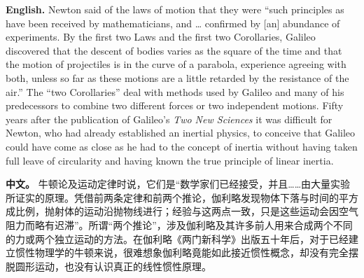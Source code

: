 \noindent\textbf{English.} Newton said of the laws of motion that they were ``such principles as have been received by mathematicians, and \ldots{} confirmed by [an] abundance of experiments. By the first two Laws and the first two Corollaries, Galileo discovered that the descent of bodies varies as the square of the time and that the motion of projectiles is in the curve of a parabola, experience agreeing with both, unless so far as these motions are a little retarded by the resistance of the air.'' The ``two Corollaries'' deal with methods used by Galileo and many of his predecessors to combine two different forces or two independent motions. Fifty years after the publication of Galileo's \emph{Two New Sciences} it was difficult for Newton, who had already established an inertial physics, to conceive that Galileo could have come as close as he had to the concept of inertia without having taken full leave of circularity and having known the true principle of linear inertia.
\par\noindent\textbf{中文。} 牛顿论及运动定律时说，它们是“数学家们已经接受，并且……由大量实验所证实的原理。凭借前两条定律和前两个推论，伽利略发现物体下落与时间的平方成比例，抛射体的运动沿抛物线进行；经验与这两点一致，只是这些运动会因空气阻力而略有迟滞”。所谓“两个推论”，涉及伽利略及其许多前人用来合成两个不同的力或两个独立运动的方法。在伽利略《两门新科学》出版五十年后，对于已经建立惯性物理学的牛顿来说，很难想象伽利略竟能如此接近惯性概念，却没有完全摆脱圆形运动，也没有认识真正的线性惯性原理。
\medskip

